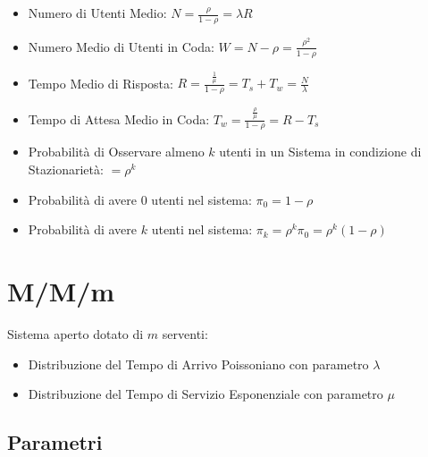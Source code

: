 \begin{itemize}
    \item Numero di Utenti Medio: $N = \frac{\rho}{1 - \rho} = \lambda R$
    \item Numero Medio di Utenti in Coda: $W = N - \rho = \frac{\rho^2}{1-\rho}$
    \item Tempo Medio di Risposta: $R = \frac{\frac{1}{\mu}}{1 - \rho} = T_s +
              T_w = \frac{N}{\lambda}$
    \item Tempo di Attesa Medio in Coda: $T_w = \frac{\frac{\rho}{\mu}}{1 -
                  \rho} = R - T_s$
    \item Probabilità di Osservare almeno $k$ utenti in un Sistema in condizione
          di Stazionarietà: $ = \rho^k$
    \item Probabilità di avere $0$ utenti nel sistema: $\pi_0 = 1 - \rho$
    \item Probabilità di avere $k$ utenti nel sistema: $\pi_k = \rho^k \pi_0 =
              \rho^k (1 - \rho)$
\end{itemize}

\section{M/M/m}

Sistema aperto dotato di $m$ serventi:

\begin{itemize}
    \item Distribuzione del Tempo di Arrivo Poissoniano con parametro $\lambda$
    \item Distribuzione del Tempo di Servizio Esponenziale con parametro $\mu$
\end{itemize}

\subsection{Parametri}

